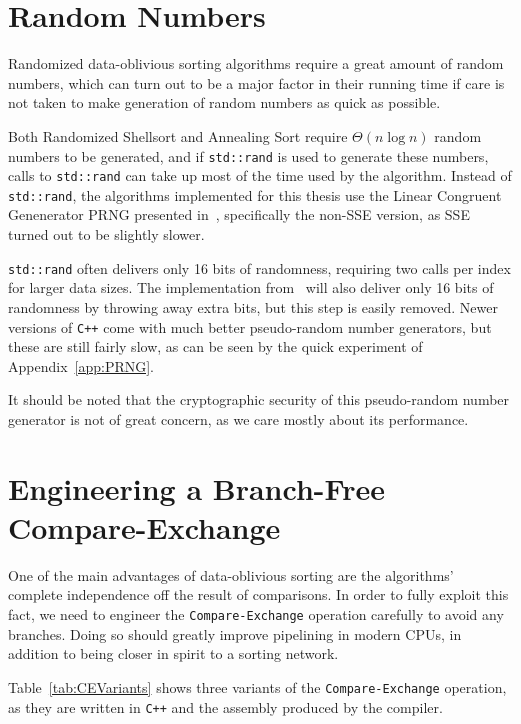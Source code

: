 \FloatBarrier
\section{Random Numbers}
\label{sec:PRNG}

Randomized data-oblivious sorting algorithms require a great amount of random numbers, which can turn out to be a major factor in their running time if care is not taken to make generation of random numbers as quick as possible.

Both Randomized Shellsort and Annealing Sort require $\Theta(n \log n)$ random numbers to be generated, and if \texttt{std::rand} is used to generate these numbers, calls to \texttt{std::rand} can take up most of the time used by the algorithm. Instead of \texttt{std::rand}, the algorithms implemented for this thesis use the Linear Congruent Genenerator PRNG presented in~, specifically the non-SSE version, as SSE turned out to be slightly slower.

\texttt{std::rand} often delivers only 16 bits of randomness, requiring two calls per index for larger data sizes. The implementation from~ will also deliver only 16 bits of randomness by throwing away extra bits, but this step is easily removed. Newer versions of \texttt{C++} come with much better pseudo-random number generators, but these are still fairly slow, as can be seen by the quick experiment of Appendix~\ref{app:PRNG}.

It should be noted that the cryptographic security of this pseudo-random number generator is not of great concern, as we care mostly about its performance.

\FloatBarrier
\section{Engineering a Branch-Free Compare-Exchange} 
\label{sec:CompareExchangeImpl}

One of the main advantages of data-oblivious sorting are the algorithms' complete independence off the result of comparisons. In order to fully exploit this fact, we need to engineer the \texttt{Compare-Exchange} operation carefully to avoid any branches. Doing so should greatly improve pipelining in modern CPUs, in addition to being closer in spirit to a sorting network.

Table~\ref{tab:CEVariants} shows three variants of the \texttt{Compare-Exchange} operation, as they are written in \texttt{C++} and the assembly produced by the compiler.

